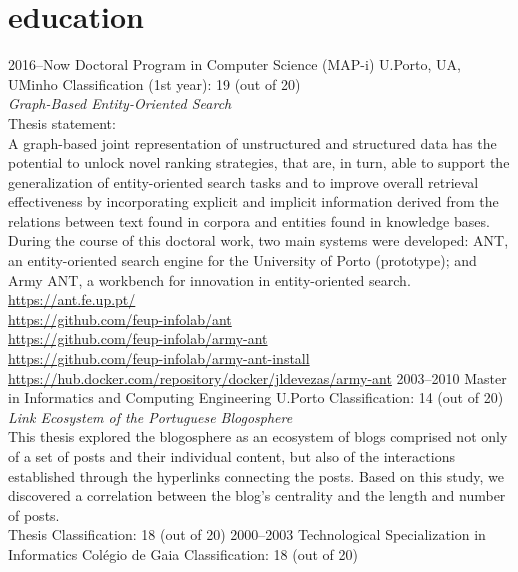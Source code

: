 \documentclass{friggeri-cv}
\begin{document}

\section{education}

\begin{entrylist}
\entry
{2016--Now}
{Doctoral Program {\normalfont in Computer Science (MAP-i)}}
{U.Porto, UA, UMinho}
{Classification (1st year): 19 (out of 20)\\[.5ex]
\emph{Graph-Based Entity-Oriented Search}\\[.5ex]
Thesis statement:\\
A graph-based joint representation of unstructured and structured data has the potential to unlock novel ranking strategies, that are, in turn, able to support the generalization of entity-oriented search tasks and to improve overall retrieval effectiveness by incorporating explicit and implicit information derived from the relations between text found in corpora and entities found in knowledge bases.\\[-.75em]

During the course of this doctoral work, two main systems were developed: ANT, an entity-oriented search engine for the University of Porto (prototype); and Army ANT, a workbench for innovation in entity-oriented search.\\[-.75em]

\url{https://ant.fe.up.pt/}\\
\url{https://github.com/feup-infolab/ant}\\[-.75em]

\url{https://github.com/feup-infolab/army-ant}\\
\url{https://github.com/feup-infolab/army-ant-install}\\
\url{https://hub.docker.com/repository/docker/jldevezas/army-ant}}
\entry
{2003--2010}
{Master {\normalfont in Informatics and Computing Engineering}}
{U.Porto}
{Classification: 14 (out of 20)\\[.5ex]
\emph{Link Ecosystem of the Portuguese Blogosphere}\\[.5ex]
This thesis explored the blogosphere as an ecosystem of blogs comprised not only of a set of posts and their
individual content, but also of the interactions established through the hyperlinks connecting the posts. Based on
this study, we discovered a correlation between the blog's centrality and the length and number of posts.\\[.5ex]
Thesis Classification: 18 (out of 20)}
\entry
{2000--2003}
{Technological Specialization {\normalfont in Informatics}}
{Colégio de Gaia}
{Classification: 18 (out of 20)}
\end{entrylist}
\end{document}
